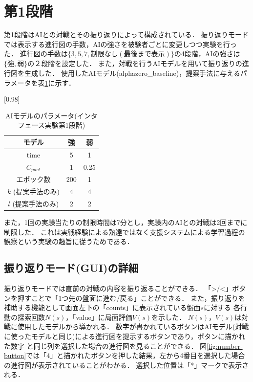 \section{第1段階}
第1段階はAIとの対戦とその振り返りによって構成されている．
振り返りモードでは表示する進行図の手数，AIの強さを被験者ごとに変更しつつ実験を行った．
進行図の手数は$\{3, 5, 7, 制限なし(最後まで表示)\}$の4段階，AIの強さは$\{強,弱\}$の２段階を設定した．
また，対戦を行うAIモデルを用いて振り返りの進行図を生成した．
使用したAIモデル(alphazero\_baseline)，提案手法に与えるパラメータを表\ref{table:param-system}に示す．
\begin{table}[H]
	\caption{AIモデルのパラメータ(インタフェース実験第1段階)}
    \label{table:param-system}
	\centering
	\scalebox{0.98}[0.98]{
		\begin{tabular}{c|c|c}
			モデル&強&弱\\\hline
			time    & 5 & 1 \\ 
			$C_{puct}$ & 1   & 0.25 \\
            エポック数 & 200 & 1 \\
			$k$ (提案手法のみ)     & 4 & 4 \\
			$l$ (提案手法のみ)     & 2 & 2 \\

		\end{tabular}
	}
	
\end{table}
また，1回の実験当たりの制限時間は7分とし，実験内のAIとの対戦は2回までに制限した．
これは実戦経験による熟達ではなく支援システムによる学習過程の観察という実験の趣旨に従うためである．
\subsection{振り返りモード(GUI)の詳細}
振り返りモードでは直前の対戦の内容を振り返ることができる．
「>/<」ボタンを押すことで「1つ先の盤面に進む/戻る」ことができる．
また，振り返りを補助する機能として画面左下の「counts」に表示されている盤面$s$に対する
各行動の探索回数$N(s)$，「value」に局面評価$V(s)$を示した．
$N(s)，V(s)$は対戦に使用したモデルから導かれる．
数字が書かれているボタンはAIモデル(対戦に使ったモデルと同じ)による進行図を提示するボタンであり，ボタンに描かれた数字
と同じ列を選択した場合の進行図を見ることができる．
図\ref{fig:number-button}では「4」と描かれたボタンを押した結果，左から4番目を選択した場合の進行図が表示されていることがわかる．
選択した位置は「*」マークで表示される．



